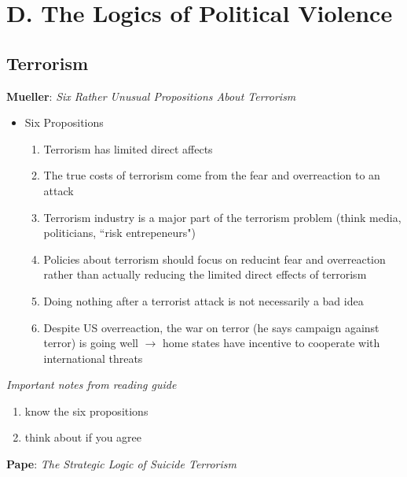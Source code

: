 \documentclass{article}
\begin{document}
\section*{D. The Logics of Political Violence}
\subsection*{Terrorism}
\textbf{Mueller}: \textit{Six Rather Unusual Propositions About Terrorism}
\begin{itemize}
    \item Six Propositions
    \begin{enumerate}
        \item Terrorism has limited direct affects
        \item The true costs of terrorism come from the fear and overreaction to an attack
        \item Terrorism industry is a major part of the terrorism problem (think media, politicians, ``risk entrepeneurs")
        \item Policies about terrorism should focus on reducint fear and overreaction rather than actually reducing the limited direct effects of terrorism
        \item Doing nothing after a terrorist attack is not necessarily a bad idea
        \item Despite US overreaction, the war on terror (he says campaign against terror) is going well $\rightarrow$ home states have incentive to cooperate with international threats
    \end{enumerate}
\end{itemize}
\textit{Important notes from reading guide}
\begin{enumerate}
    \item know the six propositions
    \item think about if you agree
\end{enumerate}
\bigskip
\textbf{Pape}: \textit{The Strategic Logic of Suicide Terrorism} 
\end{document}
